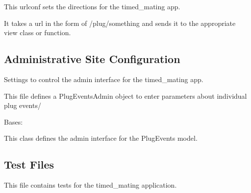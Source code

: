 \documentclass[letterpaper,10pt,english]{sphinxmanual}
\begin{document}
\label{api:module-mousedb.timed_mating.urls}
This urlconf sets the directions for the timed\_mating app.

It takes a url in the form of /plug/something and sends it to the appropriate view class or function.


\subsection{Administrative Site Configuration}
\label{api:id13}\label{api:module-mousedb.timed_mating.admin}
Settings to control the admin interface for the timed\_mating app.

This file defines a PlugEventsAdmin object to enter parameters about individual plug events/

\begin{fulllineitems}
\label{api:mousedb.timed_mating.admin.PlugEventsAdmin}
Bases: 

This class defines the admin interface for the PlugEvents model.

\begin{fulllineitems}
\label{api:mousedb.timed_mating.admin.PlugEventsAdmin.list_display}
\end{fulllineitems}


\begin{fulllineitems}
\label{api:mousedb.timed_mating.admin.PlugEventsAdmin.media}
\end{fulllineitems}


\end{fulllineitems}



\subsection{Test Files}
\label{api:id14}\label{api:module-mousedb.timed_mating.tests}
This file contains tests for the timed\_mating application.
\end{document}
